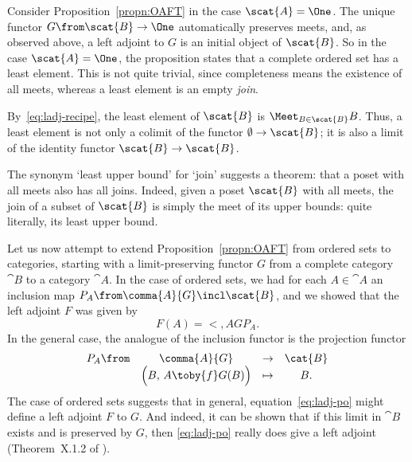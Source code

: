 \begin{example} 
\label{eg:oaft-least}
%
%
Consider Proposition~\ref{propn:OAFT} in the case $\scat{A} = \One$.  The
unique functor $G\from \scat{B} \to \One$ automatically preserves meets,
and, as observed above, a left adjoint to $G$ is an initial object of
$\scat{B}$.  So in the case $\scat{A} = \One$, the proposition states that
a complete ordered set has a least element.  This is not quite trivial,
since completeness means the existence of all meets, whereas a least
element is an empty \emph{join}.

By~\eqref{eq:ladj-recipe}, the least%
%
%
element of $\scat{B}$ is $\Meet_{B \in \scat{B}} B$.  Thus, a least element
is not only a colimit of the functor $\emptyset \to \scat{B}$; it is also a
limit of the identity functor $\scat{B} \to \scat{B}$.

The synonym `least upper bound' for `join' suggests a theorem: that a poset
with all meets also has all joins.  Indeed, given a poset $\scat{B}$ with
all meets, the join of a subset of $\scat{B}$ is simply the meet of its
upper bounds: quite literally, its least upper bound.%
%
%
\end{example}

Let us now attempt to extend Proposition~\ref{propn:OAFT} from ordered sets
to categories, starting with a limit-preserving functor $G$ from a complete
category $\cat{B}$ to a category $\cat{A}$.  In the case of ordered sets,
we had for each $A \in \cat{A}$ an inclusion map $P_A \from \comma{A}{G}
\incl \scat{B}$, and we showed that the left adjoint $F$ was given by
% 
\begin{equation}        
\label{eq:ladj-po}
F(A) = \lt{\comma{A}{G}} P_A.  
\end{equation}
% 
In the general case, the analogue of the inclusion functor is the
projection functor
% 
\begin{equation}
\label{eq:pjn-aft}
\begin{array}{cccc}
P_A\from    &\comma{A}{G}                       &\to            &\cat{B}\\
            &\Bigl(B,\, A \toby{f} G(B)\Bigr)   &\mapsto        &B.
\end{array}
\end{equation}
% 
The case of ordered sets suggests that in general,
equation~\eqref{eq:ladj-po} might define a left adjoint $F$ to $G$.  And
indeed, it can be shown that if this limit in $\cat{B}$ exists and is
preserved by $G$, then \eqref{eq:ladj-po} really does give a left adjoint
(Theorem~X.1.2 of \citeCWM).

